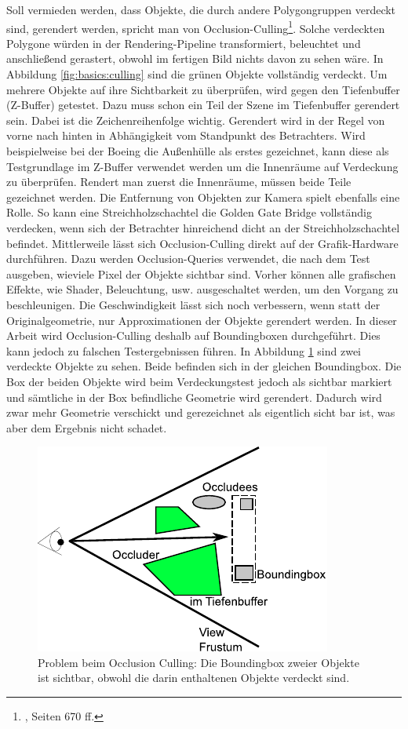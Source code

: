 Soll vermieden werden, dass Objekte, die durch andere Polygongruppen verdeckt sind, gerendert werden, spricht man von Occlusion-Culling\footnote{\cite{RTR3}, Seiten 670 ff.}. Solche verdeckten Polygone würden in der Rendering-Pipeline transformiert, beleuchtet und anschließend gerastert, obwohl im fertigen Bild nichts davon zu sehen wäre. In Abbildung \ref{fig:basics:culling} sind die grünen Objekte vollständig verdeckt. Um mehrere Objekte auf ihre Sichtbarkeit zu überprüfen, wird gegen den Tiefenbuffer (Z-Buffer) getestet. Dazu muss schon ein Teil der Szene im Tiefenbuffer gerendert sein. Dabei ist die Zeichenreihenfolge wichtig. Gerendert wird in der Regel von vorne nach hinten in Abhängigkeit vom Standpunkt des Betrachters. Wird beispielweise bei der Boeing die Außenhülle als erstes gezeichnet, kann diese als Testgrundlage im Z-Buffer verwendet werden um die Innenräume auf Verdeckung zu überprüfen. Rendert man zuerst die Innenräume, müssen beide Teile gezeichnet werden. Die Entfernung von Objekten zur Kamera spielt ebenfalls eine Rolle. So kann eine Streichholzschachtel die Golden Gate Bridge vollständig verdecken, wenn sich der Betrachter hinreichend dicht an der Streichholzschachtel befindet. Mittlerweile lässt sich Occlusion-Culling direkt auf der Grafik-Hardware durchführen. Dazu werden Occlusion-Queries verwendet, die nach dem Test ausgeben, wieviele Pixel der Objekte sichtbar sind. Vorher können alle grafischen Effekte, wie Shader, Beleuchtung, usw. ausgeschaltet werden, um den Vorgang zu beschleunigen. Die Geschwindigkeit lässt sich noch verbessern, wenn statt der Originalgeometrie, nur Approximationen der Objekte gerendert werden. In dieser Arbeit wird Occlusion-Culling deshalb auf Boundingboxen durchgeführt. Dies kann jedoch zu falschen Testergebnissen führen. In Abbildung \ref{fig:basics:oculling} sind zwei verdeckte Objekte zu sehen. Beide befinden sich in der gleichen Boundingbox. Die Box der beiden Objekte wird beim Verdeckungstest jedoch als sichtbar markiert und sämtliche in der Box befindliche Geometrie wird gerendert. Dadurch wird zwar mehr Geometrie verschickt und gerezeichnet als eigentlich sicht bar ist, was aber dem Ergebnis nicht schadet.
\begin{figure}
  \centering
  \includegraphics[scale=0.8]{images/oculling.pdf}
  \caption{Problem beim Occlusion Culling: Die Boundingbox zweier Objekte ist sichtbar, obwohl die darin enthaltenen Objekte verdeckt sind.}
  \label{fig:basics:oculling}
\end{figure}

